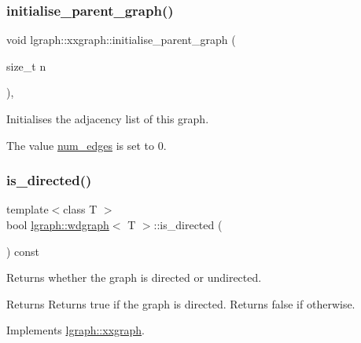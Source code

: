 \subsubsection{\texorpdfstring{initialise\+\_\+parent\+\_\+graph()}{initialise\_parent\_graph()}}
{\footnotesize\ttfamily void lgraph\+::xxgraph\+::initialise\+\_\+parent\+\_\+graph (\begin{DoxyParamCaption}\item[{size\+\_\+t}]{n }\end{DoxyParamCaption})\hspace{0.3cm}{\ttfamily [protected]}, {\ttfamily [inherited]}}



Initialises the adjacency list of this graph. 

The value \hyperlink{classlgraph_1_1xxgraph_a6765a9a3be42f6e0f824635c593b35d7}{num\+\_\+edges} is set to 0. \mbox{\label{classlgraph_1_1wdgraph_ab167f7c833e7db1a74e65a187f583ed4}} 
\subsubsection{\texorpdfstring{is\+\_\+directed()}{is\_directed()}}
{\footnotesize\ttfamily template$<$class T $>$ \\
bool \hyperlink{classlgraph_1_1wdgraph}{lgraph\+::wdgraph}$<$ T $>$\+::is\+\_\+directed (\begin{DoxyParamCaption}{ }\end{DoxyParamCaption}) const\hspace{0.3cm}{\ttfamily [virtual]}}



Returns whether the graph is directed or undirected. 

\begin{DoxyReturn}{Returns}
Returns true if the graph is directed. Returns false if otherwise. 
\end{DoxyReturn}


Implements \hyperlink{classlgraph_1_1xxgraph_a0a606d77cbbb2efa7056b82c3b8c395c}{lgraph\+::xxgraph}.

\mbox{\label{classlgraph_1_1xxgraph_af00bce8b07a42754601d1e3bebe2c1fa}} 
